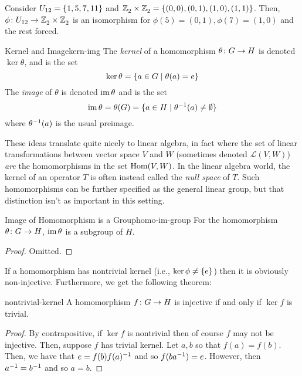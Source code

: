 \documentclass{article}
\begin{document}
\begin{example}{}{}
  Consider $U_{12} = \lbrace1, 5, 7, 11\rbrace$
  and $\mathbb{Z}^{}_{2} \times \mathbb{Z}^{}_{2} = \lbrace(0, 0), (0, 1), (1, 0), (1, 1)\rbrace$.
  Then, $\phi \colon U_{12} \to \mathbb{Z}^{}_{2} \times \mathbb{Z}^{}_{2}$ is an isomorphism for
  $\phi(5) = (0, 1), \phi(7) = (1, 0)$ and the rest forced.
\end{example}


\begin{definition}{Kernel and Image}{kern-img}
  The \emph{kernel} of a homomorphism $\theta \colon G \to H$ is denoted $\ker \theta$, and is the set
  \[ \ker\theta = \lbrace a \in G \mid \theta(a) = e \rbrace \]
  The \emph{image} of $\theta$ is denoted $\operatorname{im} \theta$ and is the set
  \[ \operatorname{im} \theta = \theta(G) = \lbrace a \in H \mid \theta^{-1}(a) \ne \emptyset \rbrace \]
  where $\theta^{-1}(a)$ is the usual preimage.
\end{definition}


These ideas translate quite nicely to linear algebra, in fact where the set of linear
transformations between vector space $V$ and $W$ (sometimes denoted $\mathcal{L}(V, W)$)
\emph{are} the homomorphisms in the set $\operatorname{Hom}(V, W)$.
In the linear algebra world, the kernel of an operator $T$ is often
instead called the \emph{null space} of $T$.
Such homomorphisms can be further specified as the general linear group, but that
distinction isn't as important in this setting.

\begin{proposition}{Image of Homomorphism is a Group}{homo-im-group}
  For the homomorphism $\theta \colon G \to H$, $\operatorname{im} \theta$ is a subgroup of $H$.
\end{proposition}
\begin{proof}
  Omitted.
\end{proof}

If a homomorphism has nontrivial kernel (i.e., $\ker \phi \ne \lbrace e\rbrace$)
then it is obviously non-injective. Furthermore, we get the following theorem:
\begin{theorem}{}{nontrivial-kernel}
  A homomorphism $f \colon G \to H$ is injective if and only if $\ker f$ is trivial.
\end{theorem}
\begin{proof}
  By contrapositive, if $\ker f$ is nontrivial then of course $f$ may not be injective.
  Then, suppose $f$ has trivial kernel.
  Let $a, b$ so that $f(a) = f(b)$.
  Then, we have that $e = f(b)f(a)^{-1}$ and so $f(b a^{-1}) = e$.
  However, then $a^{-1} = b^{-1}$ and so $a = b$.
\end{proof}
\end{document}

